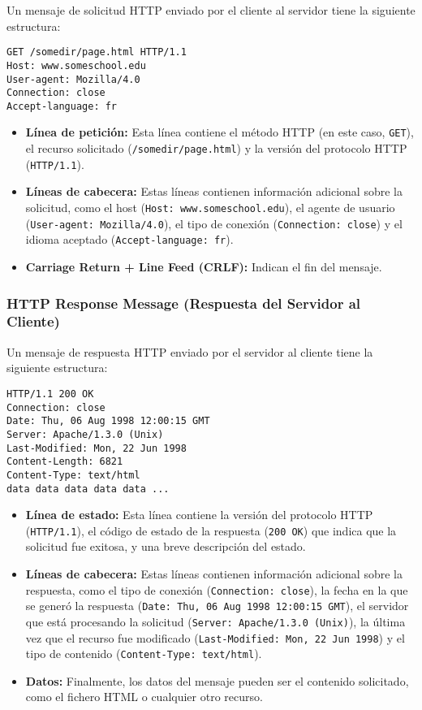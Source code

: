 \documentclass[a4paper,12pt]{article}
\begin{document}
Un mensaje de solicitud HTTP enviado por el cliente al servidor tiene la siguiente estructura:

\begin{verbatim}
GET /somedir/page.html HTTP/1.1
Host: www.someschool.edu
User-agent: Mozilla/4.0
Connection: close
Accept-language: fr
\end{verbatim}

\begin{itemize}
    \item \textbf{Línea de petición:} Esta línea contiene el método HTTP (en este caso, \texttt{GET}), el recurso solicitado (\texttt{/somedir/page.html}) y la versión del protocolo HTTP (\texttt{HTTP/1.1}).
    \item \textbf{Líneas de cabecera:} Estas líneas contienen información adicional sobre la solicitud, como el host (\texttt{Host: www.someschool.edu}), el agente de usuario (\texttt{User-agent: Mozilla/4.0}), el tipo de conexión (\texttt{Connection: close}) y el idioma aceptado (\texttt{Accept-language: fr}).
    \item \textbf{Carriage Return + Line Feed (CRLF):} Indican el fin del mensaje.
\end{itemize}

\subsubsection{HTTP Response Message (Respuesta del Servidor al Cliente)}

Un mensaje de respuesta HTTP enviado por el servidor al cliente tiene la siguiente estructura:

\begin{verbatim}
HTTP/1.1 200 OK
Connection: close
Date: Thu, 06 Aug 1998 12:00:15 GMT
Server: Apache/1.3.0 (Unix)
Last-Modified: Mon, 22 Jun 1998
Content-Length: 6821
Content-Type: text/html
data data data data data ...
\end{verbatim}

\begin{itemize}
    \item \textbf{Línea de estado:} Esta línea contiene la versión del protocolo HTTP (\texttt{HTTP/1.1}), el código de estado de la respuesta (\texttt{200 OK}) que indica que la solicitud fue exitosa, y una breve descripción del estado.
    \item \textbf{Líneas de cabecera:} Estas líneas contienen información adicional sobre la respuesta, como el tipo de conexión (\texttt{Connection: close}), la fecha en la que se generó la respuesta (\texttt{Date: Thu, 06 Aug 1998 12:00:15 GMT}), el servidor que está procesando la solicitud (\texttt{Server: Apache/1.3.0 (Unix)}), la última vez que el recurso fue modificado (\texttt{Last-Modified: Mon, 22 Jun 1998}) y el tipo de contenido (\texttt{Content-Type: text/html}).
    \item \textbf{Datos:} Finalmente, los datos del mensaje pueden ser el contenido solicitado, como el fichero HTML o cualquier otro recurso.
\end{itemize}
\end{document}
